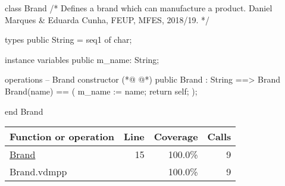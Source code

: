\begin{vdmpp}[breaklines=true]
class Brand
/*
  Defines a brand which can manufacture a product.
  Daniel Marques & Eduarda Cunha, FEUP, MFES, 2018/19.
*/

types
 public String = seq1 of char;

instance variables
 public m_name: String;
 
operations
 -- Brand constructor
(*@
\label{Brand:15}
@*)
 public Brand : String ==> Brand
 Brand(name) ==
 (
  m_name := name;
  return self;
 );

end Brand
\end{vdmpp}
\bigskip
\begin{longtable}{|l|r|r|r|}
\hline
Function or operation & Line & Coverage & Calls \\
\hline
\hline
\hyperref[Brand:15]{Brand} & 15&100.0\% & 9 \\
\hline
\hline
Brand.vdmpp & & 100.0\% & 9 \\
\hline
\end{longtable}

